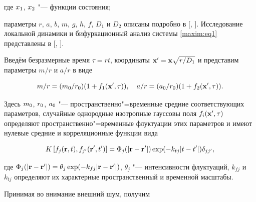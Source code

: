 где $x_{{\rm 1}}$, $x_{{\rm 2}}$ "--- функции состояния; 

параметры $r$, $a$, $b$, $m$, $g$, $h$, $f$, $D_1$ и $D_2$ описаны подробно в [, ]. Исследование локальной динамики и бифуркационный анализ системы \eqref{maxim:eq1} представлены в [, ].



Введём безразмерные время  $\tau = rt$,  координаты ${{\bf {x}'}} = {{\bf x}}\sqrt {r / D_{1}}  $ и представим параметры $m/r$ и $a/r$ в виде  

$$

m / r = (m_{0} / r_{0} )(1 + f_{1} ({{\bf {x}'}},\tau )),\quad  

a / r = (a_{0} / r_{0} )(1 + f_{2} ({{\bf {x}'}},\tau )).$$ 

Здесь $m_{{\rm 0}}$, $r_{{\rm 0}}$, $a_{{\rm 0}}$ "--- пространственно"=временные средние соответствующих параметров, случайные однородные изотропные гауссовы поля  $f_{i} ({{\bf {x}'}},\tau )$ определяют пространственно"=временные флуктуации этих параметров и имеют нулевые средние и корреляционные функции вида

$$

K\left[ {f_{j} ({{\bf r}},t),  f_{{j}'} ({{\bf {r}'}},{t}')} \right] = \Phi _{j} (\left| {{\rm {\bf r}} - {\rm {\bf {r}'}}}

\right|)\exp ( - k_{tj} {\left| {t - {t}'} \right|}) \delta_{j{j}'},$$ 

где $\Phi _{j} (\left| {{{\bf r}} - {{\bf {r}'}}} \right|) = \theta _{j} \exp ( - k_{fj} {\left| {{{\bf r}} - { {\bf {r}'}}} \right|})$, $\theta_{j}$ "--- интенсивности флуктуаций, $k_{fj}$ и~$k_{tj}$ определяют их характерные пространственный и временной масштабы.



Принимая во внимание внешний шум, получим

